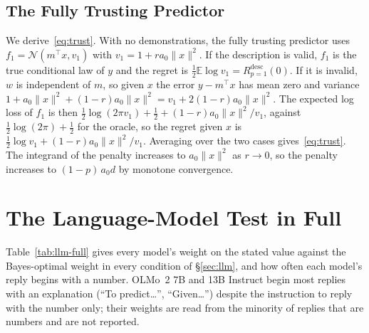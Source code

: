 \documentclass[10pt,twocolumn]{article}
\newcommand{\E}{\mathbb{E}}
\begin{document}
\subsection{The Fully Trusting Predictor}\label{app:trust}
We derive~\eqref{eq:trust}. With no demonstrations, the fully trusting predictor uses $f_1 = \mathcal{N}(m^\top x, v_1)$ with $v_1 = 1 + r a_0 \|x\|^2$. If the description is valid, $f_1$ is the true conditional law of $y$ and the regret is $\tfrac12 \E \log v_1 = R^{\mathrm{desc}}_{p=1}(0)$. If it is invalid, $w$ is independent of $m$, so given $x$ the error $y - m^\top x$ has mean zero and variance $1 + a_0\|x\|^2 + (1-r)a_0\|x\|^2 = v_1 + 2(1-r)a_0\|x\|^2$. The expected log loss of $f_1$ is then $\tfrac12 \log(2\pi v_1) + \tfrac12 + (1-r)a_0\|x\|^2/v_1$, against $\tfrac12 \log(2\pi) + \tfrac12$ for the oracle, so the regret given $x$ is $\tfrac12 \log v_1 + (1-r)a_0\|x\|^2/v_1$. Averaging over the two cases gives~\eqref{eq:trust}. The integrand of the penalty increases to $a_0\|x\|^2$ as $r \to 0$, so the penalty increases to $(1-p)\,a_0 d$ by monotone convergence.

\section{The Language-Model Test in Full}\label{app:llm}
Table~\ref{tab:llm-full} gives every model's weight on the stated value against the Bayes-optimal weight in every condition of \S\ref{sec:llm}, and how often each model's reply begins with a number. OLMo~2 7B and 13B Instruct begin most replies with an explanation (``To predict\ldots'', ``Given\ldots'') despite the instruction to reply with the number only; their weights are read from the minority of replies that are numbers and are not reported.

\begin{table}[t]
\centering\footnotesize
\setlength{\tabcolsep}{4pt}
\caption{Weight on the stated value, model/Bayes-optimal, for every condition and number of numbers shown ($2{,}000$ tasks). ``Number'' is the share of replies that begin with a three-digit number, averaged over $n$; a cell is in italics where that share is below one half at that $n$. The Bayes-optimal predictor takes a description as valid unless a reliability is stated, in which case it hedges with that $p$.}
\label{tab:llm-full}
\vspace{3pt}

\end{table}
\end{document}
